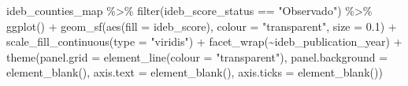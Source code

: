 \documentclass[
]{article}
\newenvironment{Shaded}{\begin{snugshade}}{\end{snugshade}}
\newcommand{\AttributeTok}[1]{\textcolor[rgb]{0.77,0.63,0.00}{#1}}
\newcommand{\FloatTok}[1]{\textcolor[rgb]{0.00,0.00,0.81}{#1}}
\newcommand{\FunctionTok}[1]{\textcolor[rgb]{0.00,0.00,0.00}{#1}}
\newcommand{\NormalTok}[1]{#1}
\newcommand{\SpecialCharTok}[1]{\textcolor[rgb]{0.00,0.00,0.00}{#1}}
\newcommand{\StringTok}[1]{\textcolor[rgb]{0.31,0.60,0.02}{#1}}
\begin{document}
\begin{Shaded}
\begin{Highlighting}[]
\NormalTok{ideb\_counties\_map }\SpecialCharTok{\%\textgreater{}\%}
  \FunctionTok{filter}\NormalTok{(ideb\_score\_status }\SpecialCharTok{==} \StringTok{"Observado"}\NormalTok{) }\SpecialCharTok{\%\textgreater{}\%}
  \FunctionTok{ggplot}\NormalTok{() }\SpecialCharTok{+}
  \FunctionTok{geom\_sf}\NormalTok{(}\FunctionTok{aes}\NormalTok{(}\AttributeTok{fill =}\NormalTok{ ideb\_score),}
          \AttributeTok{colour =} \StringTok{"transparent"}\NormalTok{, }\AttributeTok{size =} \FloatTok{0.1}\NormalTok{) }\SpecialCharTok{+}
  \FunctionTok{scale\_fill\_continuous}\NormalTok{(}\AttributeTok{type =} \StringTok{"viridis"}\NormalTok{) }\SpecialCharTok{+}
  \FunctionTok{facet\_wrap}\NormalTok{(}\SpecialCharTok{\textasciitilde{}}\NormalTok{ideb\_publication\_year) }\SpecialCharTok{+}
  \FunctionTok{theme}\NormalTok{(}\AttributeTok{panel.grid =} \FunctionTok{element\_line}\NormalTok{(}\AttributeTok{colour =} \StringTok{"transparent"}\NormalTok{),}
        \AttributeTok{panel.background =} \FunctionTok{element\_blank}\NormalTok{(),}
        \AttributeTok{axis.text =} \FunctionTok{element\_blank}\NormalTok{(),}
        \AttributeTok{axis.ticks =} \FunctionTok{element\_blank}\NormalTok{())}
\end{Highlighting}
\end{Shaded}
\end{document}
